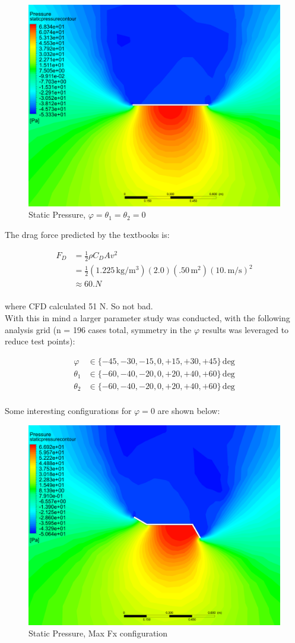 \documentclass[12pt]{article}
\begin{document}
\begin{figure}[h!]
\centering
\includegraphics[width=.6\linewidth]{../cfd_figures/flat_config_static_pressure.png}
\caption{Static Pressure, $\varphi = \theta_1 = \theta_2 = 0$}
\end{figure}

The drag force predicted by the textbooks is:

\begin{align*}
F_D &= \frac{1}{2} \rho C_D A v^2 \\
&= \frac{1}{2} (1.225 \, \text{kg/m$^3$}) (2.0) (.50 \, \text{m$^2$}) (10. \, \text{m/s})^2 \\
&\approx 60. N \\
\end{align*}

where CFD calculated 51 N.  So not bad. \\

With this in mind a larger parameter study was conducted, with the following analysis grid (n = 196 cases total, symmetry in the $\varphi$ results was leveraged to reduce test points):

\begin{align*}
\varphi &\in \{-45, -30, -15, 0, +15, +30, +45\} \, \text{deg} \\
\theta_1 &\in \{-60, -40, -20, 0, +20, +40, +60\} \, \text{deg} \\
\theta_2 &\in \{-60, -40, -20, 0, +20, +40, +60\} \, \text{deg} \\
\end{align*}

Some interesting configurations for $\varphi = 0$ are shown below:
\clearpage

\begin{figure}[h!]
\centering
\includegraphics[width=.6\linewidth]{../cfd_figures/max_fx_config_static_pressure.png}
\caption{Static Pressure, Max Fx configuration}
\end{figure}
\end{document}
